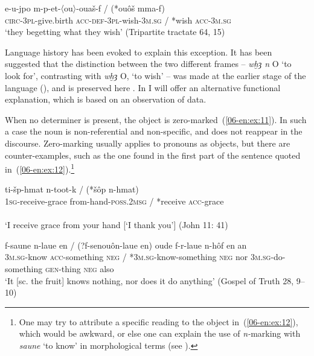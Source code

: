 \documentclass[output=paper]{LSP/langsci}
\begin{document}
\begin{exe}
\ex \label{06-en:ex:10}
\gll e-u-jpo m-p-et-〈ou〉-ouaš-f / (*ouôš mma-f)\\
	\textsc{circ-3pl-}give.birth \textsc{acc-def-3pl-}wish-3\textsc{m.sg} / *wish \textsc{acc-}3\textsc{m.sg}\\
\glt ‘they begetting what they wish’ (Tripartite tractate 64, 15)
\end{exe}

Language history has been evoked to explain this exception. It has been suggested that the distinction between the two different frames – \textit{wḫȝ n} O ‘to look for’, contrasting with \textit{wḫȝ} O, ‘to wish’ – was made at the earlier stage of the language (), and is preserved here \citep{Depuydt1993Sake}. In  I will offer an alternative functional explanation, which is based on an observation of  data.

When no determiner is present, the object is zero-marked~(\ref{06-en:ex:11}). In such a case the noun is non-referential and non-specific, and does not reappear in the discourse. Zero-marking usually applies to  pronouns as objects, but there are counter-examples, such as the one found in the first part of the sentence quoted in~(\ref{06-en:ex:12}).\footnote{One may try to attribute a specific reading to the object in~(\ref{06-en:ex:12}), which would be awkward, or else one can explain the use of \textit{n-}marking with \textit{sa}\textit{une} ‘to know’ in morphological terms (see ).}

\begin{exe}
\ex \label{06-en:ex:11}
\gll ti-šp-hmat 				n-toot-k / (*šôp n-hmat)\\
 \textsc{1sg-}receive-grace from-hand-\textsc{poss.2msg } / *receive \textsc{acc-}grace\\\\
\glt ‘I receive grace from your hand [\ie ‘I thank you’] (John 11: 41)
\end{exe}

\begin{exe}
\ex \label{06-en:ex:12}
\gll f-saune 		n-laue 		en / (?f-senouôn-laue en)	oude 	f-r-laue 		n-hôf 	en 		an \\
\textsc{3m.sg-}know \textsc{acc-}something \textsc{neg} / *\textsc{3m.sg-}know-something \textsc{neg} nor \textsc{3m.sg-}do-something \textsc{gen-}thing \textsc{neg} also\\
\glt ‘It [sc. the fruit] knows nothing, nor does it do anything’ (Gospel of Truth 28, 9–10)
\end{exe}
\end{document}
